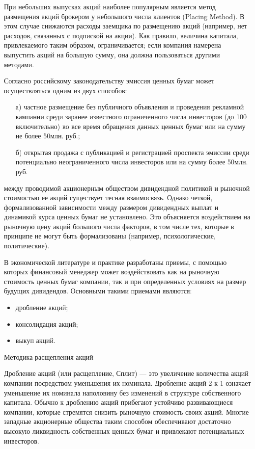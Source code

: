 При небольших выпусках акций наиболее популярным является метод размещения акций брокером у небольшого числа клиентов (Placing Method). В этом случае снижаются расходы заемщика по размещению акций (например, нет расходов, связанных с подпиской на акции). Как правило, величина капитала, привлекаемого таким образом, ограничивается; если компания намерена выпустить акций на большую сумму, она должна пользоваться другими методами. 

Согласно российскому законодательству эмиссия ценных бумаг может осуществляться одним из двух способов: 
\begin{itemize}
	\item [а)] частное размещение без публичного объявления и проведения рекламной кампании среди заранее известного ограниченного числа инвесторов (до 100 включительно) во все время обращения данных ценных бумаг или на сумму не более 50млн. руб.; 
	\item [б)] открытая продажа с публикацией и регистрацией проспекта эмиссии среди потенциально неограниченного числа инвесторов или на сумму более 50млн. руб. 
\end{itemize}

между проводимой акционерным обществом дивидендной политикой и рыночной стоимостью ее акций существует тесная взаимосвязь. Однако четкой, формализованной зависимости между размером дивидендных выплат и динамикой курса ценных бумаг не установлено. Это объясняется воздействием на рыночную цену акций большого числа факторов, в том числе тех, которые в принципе не могут быть формализованы (например, психологические, политические).

В экономической литературе и практике разработаны приемы, с помощью которых финансовый менеджер может воздействовать как на рыночную стоимость ценных бумаг компании, так и при определенных условиях на размер будущих дивидендов. Основными такими приемами являются:
\begin{itemize}
	\item дробление акций;
	\item консолидация акций;
	\item выкуп акций.
\end{itemize}

Методика расщепления акций

Дробление акций (или расщепление, Сплит) --- это увеличение количества акций компании посредством уменьшения их номинала. Дробление акций 2 к 1 означает уменьшение их номинала наполовину без изменений в структуре собственного капитала. Обычно к дроблению акций прибегают устойчиво развивающиеся компании, которые стремятся снизить рыночную стоимость своих акций. Многие западные акционерные общества таким способом обеспечивают достаточно высокую ликвидность собственных ценных бумаг и привлекают потенциальных инвесторов.

